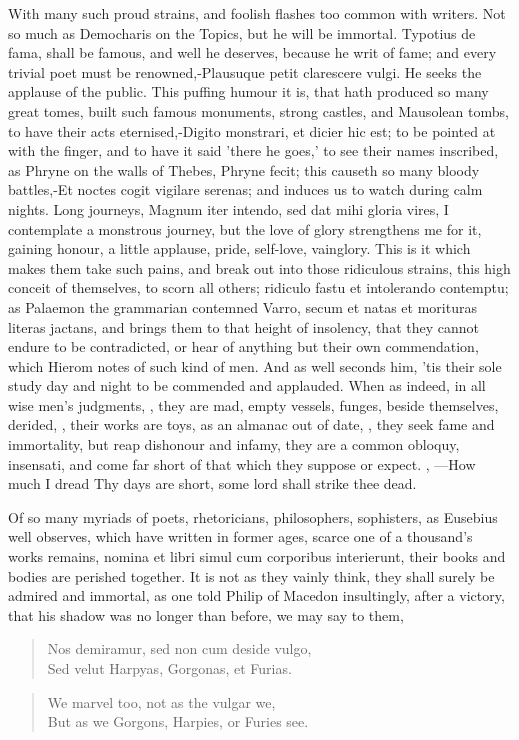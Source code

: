 {{With many such proud strains, and foolish flashes too common with writers. Not so much as Democharis on
the  Topics, but he will be immortal. Typotius de fama, shall be
famous, and well he deserves, because he writ of fame; and every
trivial poet must be renowned,-Plausuque petit clarescere vulgi. He
seeks the applause of the public. This puffing humour it is, that hath
produced so many great tomes, built such famous monuments, strong
castles, and Mausolean tombs, to have their acts eternised,-Digito
monstrari, et dicier hic est; to be pointed at with the finger, and to
have it said 'there he goes,' to see their names inscribed, as Phryne
on the walls of Thebes, Phryne fecit; this causeth so many bloody
battles,-Et noctes cogit vigilare serenas; and induces us to watch
during calm nights. Long journeys, Magnum iter intendo, sed dat mihi
gloria vires, I contemplate a monstrous journey, but the love of glory
strengthens me for it, gaining honour, a little applause, pride,
self-love, vainglory. This is it which makes them take such pains, and
break out into those ridiculous strains, this high conceit of
themselves, to scorn all others; ridiculo fastu et intolerando
contemptu; as Palaemon the grammarian contemned Varro, secum et
natas et morituras literas jactans, and brings them to that height of
insolency, that they cannot endure to be contradicted, or hear of
anything but their own commendation, which Hierom notes of such kind of
men. And as \Austin{} well seconds him, 'tis their sole study day
and night to be commended and applauded. When as indeed, in all wise
men's judgments, , they are mad, empty vessels,
funges, beside themselves, derided, , their works are toys, as
an almanac out of date, , they
seek fame and immortality, but reap dishonour and infamy, they are a
common obloquy, insensati, and come far short of that which they
suppose or expect. ,
---How much I dread
Thy days are short, some lord shall strike thee dead.

Of so many myriads of poets, rhetoricians, philosophers, sophisters, as
Eusebius well observes, which have written in former ages, scarce
one of a thousand's works remains, nomina et libri simul cum corporibus
interierunt, their books and bodies are perished together. It is not as
they vainly think, they shall surely be admired and immortal, as one
told Philip of Macedon insultingly, after a victory, that his shadow
was no longer than before, we may say to them,
%
\begin{verse}
\textlatin{Nos demiramur, sed non cum deside vulgo,}\\
\textlatin{Sed velut Harpyas, Gorgonas, et Furias.}
\end{verse}
\translationrule
\begin{verse}
We marvel too, not as the vulgar we,\\
But as we Gorgons, Harpies, or Furies see.
\end{verse}

}}
